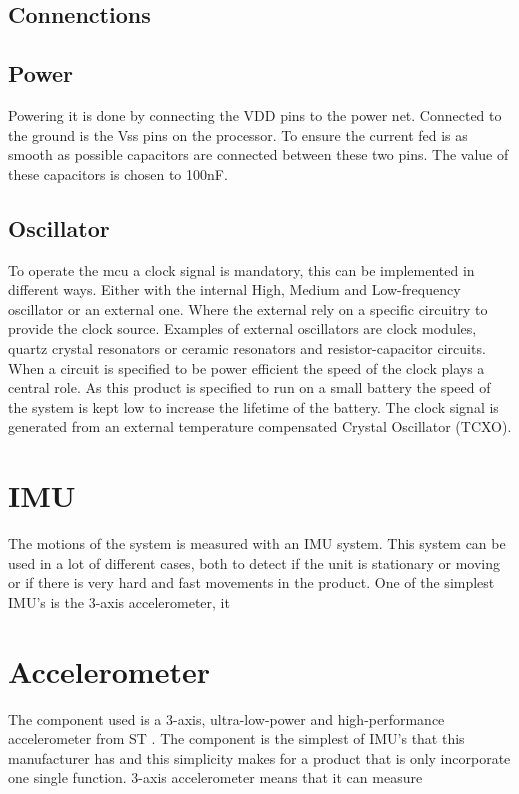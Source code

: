 \subsection{Connenctions}

 \subsection{Power}
Powering it is done by connecting the VDD pins to the power net. Connected to the ground is the Vss pins on the processor. To ensure the current fed is as smooth as possible capacitors are connected between these two pins. The value of these capacitors is chosen to 100nF.  

\subsection{Oscillator}
To operate the \gls{mcu} a clock signal is mandatory, this can be implemented in different ways. Either with the internal High, Medium and Low-frequency oscillator or an external one. Where the external rely on a specific circuitry to provide the clock source. Examples of external oscillators are clock modules, quartz crystal resonators or ceramic resonators and resistor-capacitor circuits. When a circuit is specified to be power efficient the speed of the clock plays a central role. As this product is specified to run on a small battery the speed of the system is kept low to increase the lifetime of the battery. The clock signal is generated from an external temperature compensated Crystal Oscillator (TCXO).


\section{IMU}
The motions of the system is measured with an IMU system. This system can be used in a lot of different cases, both to detect if the unit is stationary or moving or if there is very hard and fast movements in the product. One of the simplest IMU's is the 3-axis accelerometer, it

\newpage
\section{Accelerometer} %
The component used is a 3-axis, ultra-low-power and high-performance accelerometer from ST \cite{ST_acc}. The component is the simplest of IMU's that this manufacturer has and this simplicity makes for a product that is only incorporate one single function. 3-axis accelerometer means that it can measure 

